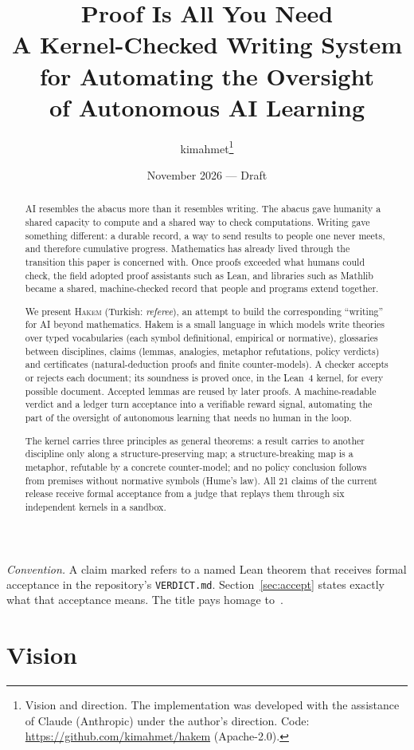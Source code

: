 \documentclass[11pt]{article}
\title{Proof Is All You Need\\[4pt]
\large A Kernel-Checked Writing System for Automating the Oversight\\ of Autonomous AI Learning}
\author{kimahmet\thanks{Vision and direction. The implementation was developed with the
assistance of Claude (Anthropic) under the author's direction.
Code: \url{https://github.com/kimahmet/hakem} (Apache-2.0).}}
\date{November 2026 --- Draft}
\newcommand{\ok}{\textsuperscript{\checkmark}}
\begin{document}
\maketitle

\begin{abstract}
AI resembles the abacus more than it resembles writing. The abacus gave humanity a shared
capacity to compute and a shared way to check computations. Writing gave something
different: a durable record, a way to send results to people one never meets, and therefore
cumulative progress. Mathematics has already lived through the transition this paper is
concerned with. Once proofs exceeded what humans could check, the field adopted proof
assistants such as Lean, and libraries such as Mathlib became a shared, machine-checked
record that people and programs extend together.

We present \textsc{Hakem} (Turkish: \emph{referee}), an attempt to build the corresponding
``writing'' for AI beyond mathematics. Hakem is a small language in which models write
theories over typed vocabularies (each symbol definitional, empirical or normative),
glossaries between disciplines, claims (lemmas, analogies, metaphor refutations, policy
verdicts) and certificates (natural-deduction proofs and finite counter-models). A checker
accepts or rejects each document; its soundness is proved once, in the Lean~4 kernel, for
every possible document. Accepted lemmas are reused by later proofs. A machine-readable
verdict and a ledger turn acceptance into a verifiable reward signal, automating the part of
the oversight of autonomous learning that needs no human in the loop.

The kernel carries three principles as general theorems: a result carries to another
discipline only along a structure-preserving map; a structure-breaking map is a metaphor,
refutable by a concrete counter-model; and no policy conclusion follows from premises
without normative symbols (Hume's law). All 21 claims of the current release receive formal
acceptance from a judge that replays them through six independent kernels in a sandbox.
\end{abstract}

\noindent\emph{Convention.} A claim marked \ok{} refers to a named Lean theorem that receives
formal acceptance in the repository's \texttt{VERDICT.md}. Section~\ref{sec:accept} states
exactly what that acceptance means. The title pays homage to~\cite{vaswani2017attention}.

\section{Vision}
\end{document}

